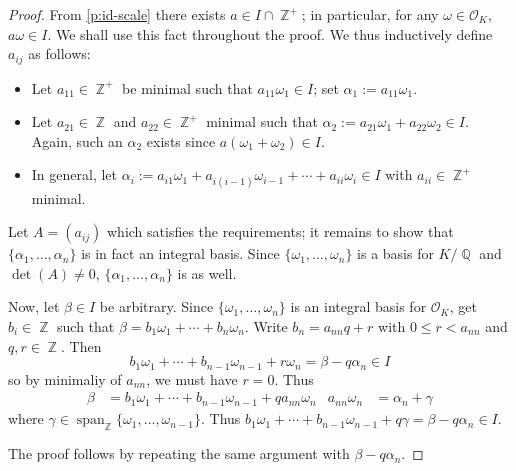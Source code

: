 \documentclass[11pt, a4paper]{memoir}
\DeclareMathOperator{\Q}{{\mathbb{Q}}}
\DeclareMathOperator{\Z}{{\mathbb{Z}}}
\theoremstyle{change}
\newtheorem{corollary}[theorem]{Corollary.}
\theoremstyle{plain}
\theoremstyle{nonumberplain}
\newtheorem{proof}{Proof}
\DeclareMathOperator{\spn}{span}
\numberwithin{equation}{section}
\begin{document}
\begin{proof}
    From \cref{p:id-scale} there exists $a\in I\cap\Z^+$; in particular, for any $\omega\in\mathcal{O}_K$, $a\omega\in I$.
    We shall use this fact throughout the proof.
    We thus inductively define $a_{ij}$ as follows:
    \begin{itemize}[nl]
        \item Let $a_{11}\in\Z^+$ be minimal such that $a_{11}\omega_1\in I$; set $\alpha_1:=a_{11}\omega_1$.
        \item Let $a_{21}\in\Z$ and $a_{22}\in\Z^+$ minimal such that $\alpha_2:=a_{21}\omega_1+a_{22}\omega_2\in I$.
            Again, such an $\alpha_2$ exists since $a(\omega_1+\omega_2)\in I$.
        \item In general, let $\alpha_i:=a_{i1}\omega_1+a_{i(i-1)}\omega_{i-1}+\cdots+a_{ii}\omega_i\in I$ with $a_{ii}\in\Z^+$ minimal.
    \end{itemize}
    Let $A=(a_{ij})$ which satisfies the requirements; it remains to show that $\{\alpha_1,\ldots,\alpha_n\}$ is in fact an integral basis.
    Since $\{\omega_1,\ldots,\omega_n\}$ is a basis for $K/\Q$ and $\det(A)\neq 0$, $\{\alpha_1,\ldots,\alpha_n\}$ is as well.

    Now, let $\beta\in I$ be arbitrary.
    Since $\{\omega_1,\ldots,\omega_n\}$ is an integral basis for $\mathcal{O}_K$, get $b_i\in\Z$ such that $\beta=b_1\omega_1+\cdots+b_n\omega_n$.
    Write $b_n=a_{nn}q+r$ with $0\leq r<a_{nn}$ and $q,r\in\Z$.
    Then
    \begin{equation*}
        b_1\omega_1+\cdots+b_{n-1}\omega_{n-1}+r\omega_n=\beta-q\alpha_n\in I
    \end{equation*}
    so by minimaliy of $a_{nn}$, we must have $r=0$.
    Thus
    \begin{align*}
        \beta&=b_1\omega_1+\cdots+b_{n-1}\omega_{n-1}+qa_{nn}\omega_n & a_{nn}\omega_n&=\alpha_n+\gamma
    \end{align*}
    where $\gamma\in\spn_{\Z}\{\omega_1,\ldots,\omega_{n-1}\}$.
    Thus $b_1\omega_1+\cdots+b_{n-1}\omega_{n-1}+q\gamma=\beta-q\alpha_n\in I$.

    The proof follows by repeating the same argument with $\beta-q\alpha_n$.
\end{proof}
\end{document}
